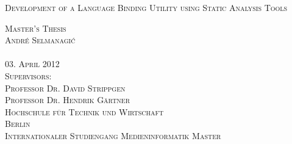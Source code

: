 \thispagestyle{empty}


\begin{center}

\vspace*{2cm}
\Large
\textsc{Development of a Language Binding Utility using Static Analysis Tools}\\

\vspace{3cm}

\textsc{Master's Thesis\\[0.5\baselineskip]
André Selmanagi\'{c}\\
{\normalsize \textsc{}}}\\

\vspace{3cm}
\textsc{03. April 2012}\\ %

\vspace{1cm}
\textsc{Supervisors:\\
Professor Dr. David Strippgen\\
Professor Dr. Hendrik Gärtner}\\

\vspace{1cm}
\textsc{Hochschule für Technik und Wirtschaft\\
Berlin\\
Internationaler Studiengang Medieninformatik Master}

\end{center}

\addtocounter{page}{-1}
